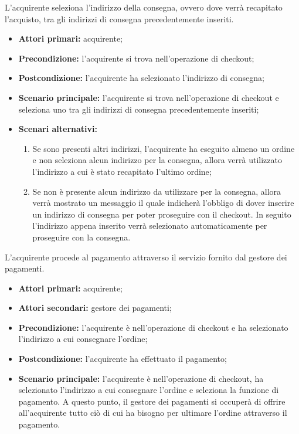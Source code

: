 L'acquirente seleziona l'indirizzo della consegna, ovvero dove verrà recapitato l'acquisto, tra gli indirizzi di consegna precedentemente inseriti.
\begin{itemize}
    \item \textbf{Attori primari:} acquirente;
    \item \textbf{Precondizione:} l'acquirente si trova nell'operazione di checkout;
    \item \textbf{Postcondizione:} l'acquirente ha selezionato l'indirizzo di consegna;
    \item \textbf{Scenario principale:} l'acquirente si trova nell'operazione di checkout e seleziona uno tra gli indirizzi di consegna precedentemente inseriti;
    \item \textbf{Scenari alternativi:}
    \begin{enumerate}[label=\lett]
        \item Se sono presenti altri indirizzi, l'acquirente ha eseguito almeno un ordine e non seleziona alcun indirizzo per la consegna, allora verrà utilizzato l'indirizzo a cui è stato recapitato l'ultimo ordine;
        \item Se non è presente alcun indirizzo da utilizzare per la consegna, allora verrà mostrato un messaggio il quale indicherà l'obbligo di dover inserire un indirizzo di consegna per poter proseguire con il checkout. In seguito l'indirizzo appena inserito verrà selezionato automaticamente per proseguire con la consegna.
    \end{enumerate}
\end{itemize}

\label{checkout.pagamento}

L'acquirente procede al pagamento attraverso il servizio fornito dal gestore dei pagamenti.
\begin{itemize}
    \item \textbf{Attori primari:} acquirente;
    \item \textbf{Attori secondari:} gestore dei pagamenti;
    \item \textbf{Precondizione:} l'acquirente è nell'operazione di checkout e ha selezionato l'indirizzo a cui consegnare l'ordine;
    \item \textbf{Postcondizione:} l'acquirente ha effettuato il pagamento;
    \item \textbf{Scenario principale:} l'acquirente è nell'operazione di checkout, ha selezionato l'indirizzo a cui consegnare l'ordine e seleziona la funzione di pagamento. A questo punto, il gestore dei pagamenti si occuperà di offrire all'acquirente tutto ciò di cui ha bisogno per ultimare l'ordine attraverso il pagamento.
\end{itemize}

